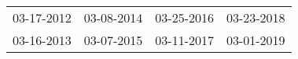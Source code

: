 \begin{supertabular}{llll}
 03-17-2012 &  03-08-2014 &  03-25-2016 &  03-23-2018 \\
 03-16-2013 &  03-07-2015 &  03-11-2017 &  03-01-2019 \\
\end{supertabular}
